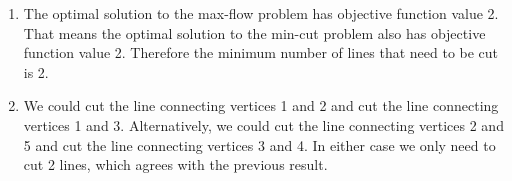 \documentclass{article}
\begin{document}
\begin{enumerate}
\begin{enumerate}
\item 

The optimal solution to the max-flow problem has objective function value 2. That means the optimal solution to the min-cut problem also has objective function value 2. Therefore the minimum number of lines that need to be cut is 2. 

\item

We could cut the line connecting vertices 1 and 2 and cut the line connecting vertices 1 and 3. 
Alternatively, we could cut the line connecting vertices 2 and 5 and cut the line connecting vertices 3 and 4. In either case we only need to cut 2 lines, which agrees with the previous result. 




\end{enumerate}

\end{enumerate}
\end{document}
